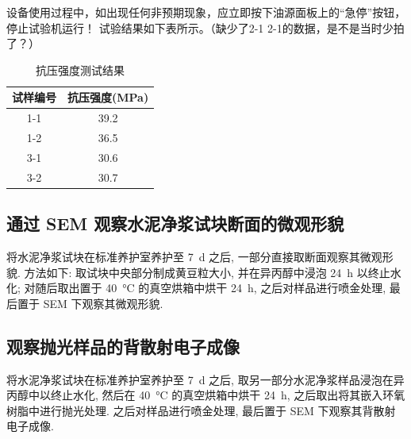 设备使用过程中，如出现任何非预期现象，应立即按下油源面板上的“急停”按钮，停止试验机运行！
试验结果如下表所示。（缺少了2-1 2-1的数据，是不是当时少拍了？）
\begin{table}[!t]
    \centering
    \caption{抗压强度测试结果}
    \begin{tabular}{|c|c|}
    \hline
    试样编号 & 抗压强度(MPa) \\ \hline
    1-1  & 39.2      \\ \hline
    1-2  & 36.5      \\ \hline
    3-1  & 30.6      \\ \hline
    3-2  & 30.7      \\ \hline
    \end{tabular}
\end{table}

\subsection{通过 SEM 观察水泥净浆试块断面的微观形貌}

将水泥净浆试块在标准养护室养护至 \SI{7}{\day} 之后, 一部分直接取断面观察其微观形貌.
方法如下: 取试块中央部分制成黄豆粒大小, 并在异丙醇中浸泡 \SI{24}{\hour} 以终止水化; 对随后取出置于 \SI{40}{\degreeCelsius} 的真空烘箱中烘干 \SI{24}{\hour}, 之后对样品进行喷金处理, 最后置于 SEM 下观察其微观形貌.

\subsection{观察抛光样品的背散射电子成像}

将水泥净浆试块在标准养护室养护至 \SI{7}{\day} 之后, 取另一部分水泥净浆样品浸泡在异丙醇中以终止水化, 然后在 \SI{40}{\degreeCelsius} 的真空烘箱中烘干 \SI{24}{\hour}, 之后取出将其嵌入环氧树脂中进行抛光处理.
之后对样品进行喷金处理, 最后置于 SEM 下观察其背散射电子成像.
